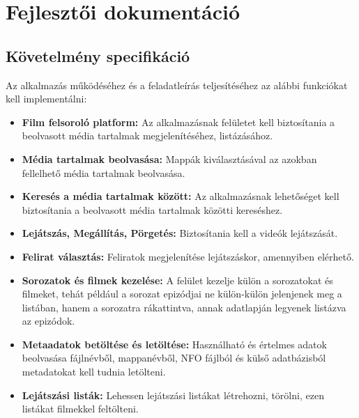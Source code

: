 \chapter{Fejlesztői dokumentáció} %
\label{ch:dev}

\section{Követelmény specifikáció}
Az alkalmazás működéséhez és a feladatleírás teljesítéséhez az alábbi funkciókat kell implementálni:
\begin{itemize}
    \item {\textbf {Film felsoroló platform: }} Az alkalmazásnak felületet kell biztosítania a beolvasott média tartalmak megjelenítéséhez, listázásához.
    \item {\textbf {Média tartalmak beolvasása: }} Mappák kiválasztásával az azokban fellelhető média tartalmak beolvasása.
	\item {\textbf {Keresés a média tartalmak között: }} Az alkalmazásnak lehetőséget kell biztosítania a beolvasott média tartalmak közötti kereséshez.
	\item {\textbf {Lejátszás, Megállítás, Pörgetés: }} Biztosítania kell a videók lejátszását.
	\item {\textbf {Felirat választás: }} Feliratok megjelenítése lejátszáskor, amennyiben elérhető.
	\item {\textbf {Sorozatok és filmek kezelése: }} A felület kezelje külön a sorozatokat és filmeket, tehát például a sorozat epizódjai ne külön-külön jelenjenek meg a listában, hanem a sorozatra rákattintva, annak adatlapján legyenek listázva az epizódok.
	\item {\textbf {Metaadatok betöltése és letöltése: }} Használható és értelmes adatok beolvasása fájlnévből, mappanévből, NFO fájlból és külső adatbázisból metadatokat kell tudnia letölteni.
    \item {\textbf {Lejátszási listák: }} Lehessen lejátszási listákat létrehozni, törölni, ezen listákat filmekkel feltölteni.
\end{itemize}

